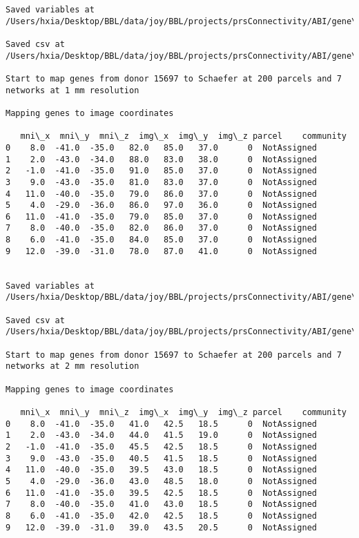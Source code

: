 \documentclass[11pt]{article}
\begin{document}
\begin{Verbatim}[commandchars=\\\{\}]
Saved variables at /Users/hxia/Desktop/BBL/data/joy/BBL/projects/prsConnectivity/ABI/gene\_mapping/15697donor\_100Parcels\_17Network\_2mm.pkl

Saved csv at /Users/hxia/Desktop/BBL/data/joy/BBL/projects/prsConnectivity/ABI/gene\_mapping/15697donor\_100Parcels\_17Network\_2mm.csv

Start to map genes from donor 15697 to Schaefer at 200 parcels and 7 networks at 1 mm resolution

Mapping genes to image coordinates

   mni\_x  mni\_y  mni\_z  img\_x  img\_y  img\_z parcel    community
0    8.0  -41.0  -35.0   82.0   85.0   37.0      0  NotAssigned
1    2.0  -43.0  -34.0   88.0   83.0   38.0      0  NotAssigned
2   -1.0  -41.0  -35.0   91.0   85.0   37.0      0  NotAssigned
3    9.0  -43.0  -35.0   81.0   83.0   37.0      0  NotAssigned
4   11.0  -40.0  -35.0   79.0   86.0   37.0      0  NotAssigned
5    4.0  -29.0  -36.0   86.0   97.0   36.0      0  NotAssigned
6   11.0  -41.0  -35.0   79.0   85.0   37.0      0  NotAssigned
7    8.0  -40.0  -35.0   82.0   86.0   37.0      0  NotAssigned
8    6.0  -41.0  -35.0   84.0   85.0   37.0      0  NotAssigned
9   12.0  -39.0  -31.0   78.0   87.0   41.0      0  NotAssigned


Saved variables at /Users/hxia/Desktop/BBL/data/joy/BBL/projects/prsConnectivity/ABI/gene\_mapping/15697donor\_200Parcels\_7Network\_1mm.pkl

Saved csv at /Users/hxia/Desktop/BBL/data/joy/BBL/projects/prsConnectivity/ABI/gene\_mapping/15697donor\_200Parcels\_7Network\_1mm.csv

Start to map genes from donor 15697 to Schaefer at 200 parcels and 7 networks at 2 mm resolution

Mapping genes to image coordinates

   mni\_x  mni\_y  mni\_z  img\_x  img\_y  img\_z parcel    community
0    8.0  -41.0  -35.0   41.0   42.5   18.5      0  NotAssigned
1    2.0  -43.0  -34.0   44.0   41.5   19.0      0  NotAssigned
2   -1.0  -41.0  -35.0   45.5   42.5   18.5      0  NotAssigned
3    9.0  -43.0  -35.0   40.5   41.5   18.5      0  NotAssigned
4   11.0  -40.0  -35.0   39.5   43.0   18.5      0  NotAssigned
5    4.0  -29.0  -36.0   43.0   48.5   18.0      0  NotAssigned
6   11.0  -41.0  -35.0   39.5   42.5   18.5      0  NotAssigned
7    8.0  -40.0  -35.0   41.0   43.0   18.5      0  NotAssigned
8    6.0  -41.0  -35.0   42.0   42.5   18.5      0  NotAssigned
9   12.0  -39.0  -31.0   39.0   43.5   20.5      0  NotAssigned



\end{Verbatim}
\end{document}
